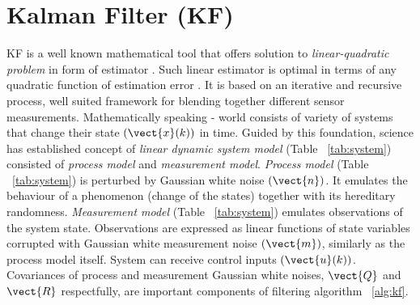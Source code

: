 \section{Kalman Filter (KF)}  \label{sec:kf}
KF \cite{kalman60}  is a well known mathematical tool that offers solution to \textit{linear-quadratic problem} in form of estimator \cite{grewal01,ristic04}. Such linear estimator is optimal in terms of any quadratic function of estimation error \cite{grewal01}. It is based on an iterative and recursive process, well suited framework for blending together different sensor measurements. Mathematically speaking - world consists of variety of systems that change their state $(\vect{x}(k))$ in time. Guided by this foundation, science has established concept of \textit{linear dynamic system model} (Table ~\ref{tab:system}) consisted of \textit{process model} and \textit{measurement model}. \textit{Process model} (Table ~\ref{tab:system}) is perturbed by Gaussian white noise $(\vect{n})$. It emulates the behaviour of a phenomenon (change of the states) together with its hereditary randomness. \textit{Measurement model} (Table ~\ref{tab:system}) emulates observations of the system state. Observations are expressed as linear functions of state variables corrupted with Gaussian white measurement noise $(\vect{m})$, similarly as the process model itself. System can receive control inputs $(\vect{u}(k))$. Covariances of process and measurement Gaussian white noises, $\vect{Q}$ and $\vect{R}$ respectfully, are important components of filtering algorithm ~\ref{alg:kf}.
